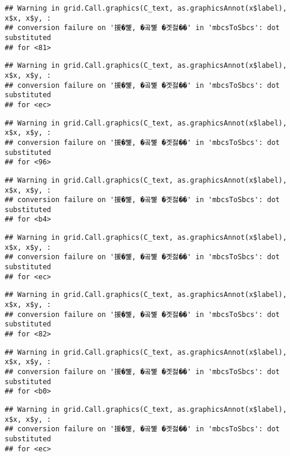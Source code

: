 \documentclass[
]{article}
\begin{document}
\begin{verbatim}
## Warning in grid.Call.graphics(C_text, as.graphicsAnnot(x$label), x$x, x$y, :
## conversion failure on '援�뼱, �곸뼱 �곗젏��' in 'mbcsToSbcs': dot substituted
## for <81>
\end{verbatim}

\begin{verbatim}
## Warning in grid.Call.graphics(C_text, as.graphicsAnnot(x$label), x$x, x$y, :
## conversion failure on '援�뼱, �곸뼱 �곗젏��' in 'mbcsToSbcs': dot substituted
## for <ec>
\end{verbatim}

\begin{verbatim}
## Warning in grid.Call.graphics(C_text, as.graphicsAnnot(x$label), x$x, x$y, :
## conversion failure on '援�뼱, �곸뼱 �곗젏��' in 'mbcsToSbcs': dot substituted
## for <96>
\end{verbatim}

\begin{verbatim}
## Warning in grid.Call.graphics(C_text, as.graphicsAnnot(x$label), x$x, x$y, :
## conversion failure on '援�뼱, �곸뼱 �곗젏��' in 'mbcsToSbcs': dot substituted
## for <b4>
\end{verbatim}

\begin{verbatim}
## Warning in grid.Call.graphics(C_text, as.graphicsAnnot(x$label), x$x, x$y, :
## conversion failure on '援�뼱, �곸뼱 �곗젏��' in 'mbcsToSbcs': dot substituted
## for <ec>
\end{verbatim}

\begin{verbatim}
## Warning in grid.Call.graphics(C_text, as.graphicsAnnot(x$label), x$x, x$y, :
## conversion failure on '援�뼱, �곸뼱 �곗젏��' in 'mbcsToSbcs': dot substituted
## for <82>
\end{verbatim}

\begin{verbatim}
## Warning in grid.Call.graphics(C_text, as.graphicsAnnot(x$label), x$x, x$y, :
## conversion failure on '援�뼱, �곸뼱 �곗젏��' in 'mbcsToSbcs': dot substituted
## for <b0>
\end{verbatim}

\begin{verbatim}
## Warning in grid.Call.graphics(C_text, as.graphicsAnnot(x$label), x$x, x$y, :
## conversion failure on '援�뼱, �곸뼱 �곗젏��' in 'mbcsToSbcs': dot substituted
## for <ec>
\end{verbatim}
\end{document}
